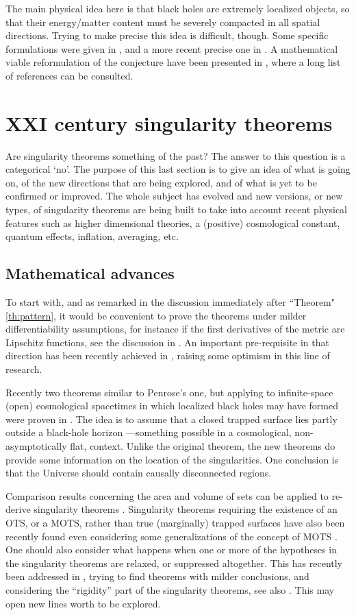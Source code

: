 \documentclass[12pt]{iopart}
\begin{document}
The main physical idea here is that black holes are extremely localized objects, so that their energy/matter content must be severely compacted in all spatial directions. Trying to make precise this idea is difficult, though. Some specific formulations were given in \cite{Fla}, and a more recent precise one in \cite{GiHoop,CGP}. A mathematical viable reformulation of the conjecture have been presented in \cite{S4}, where a long list of references can be consulted. 

 
\section{XXI century singularity theorems}\label{sec:XXI}
Are singularity theorems something of the past? The answer to this question is a categorical `no'. The purpose of this last section is to give an idea of what is going on, of the new directions that are being explored, and of what is yet to be confirmed or improved. The whole subject has evolved and new versions, or new types, of singularity theorems are being built to take into account recent physical features such as higher dimensional theories, a (positive) cosmological constant, quantum effects, inflation, averaging, etc. 

\subsection{Mathematical advances}
To start with, and as remarked in the discussion immediately after ``Theorem" \ref{th:pattern}, it would be convenient to prove the theorems under milder differentiability assumptions, for instance if the first derivatives of the metric are Lipschitz functions, see the discussion in \cite{S1}. An important pre-requisite in that direction has been recently achieved in \cite{Ming,KSSV}, raising some optimism in this line of research. 

Recently two theorems similar to Penrose's one, but applying to infinite-space (open) cosmological spacetimes in which localized black holes may have formed were proven in \cite{VW}. The idea is to assume that a closed trapped surface lies partly outside a black-hole horizon ---something possible in a cosmological, non-asymptotically flat, context. Unlike the original theorem, the new theorems do provide some information on the location of the singularities. One conclusion is that the Universe should contain causally disconnected regions.

Comparison results concerning the area and volume of sets can be applied to re-derive singularity theorems \cite{TG}. Singularity theorems requiring the existence of an OTS, or a MOTS, rather than true (marginally) trapped surfaces have also been recently found \cite{AMMS} even considering some generalizations of the concept of MOTS \cite{EGP,CeS1}. One should also consider what happens when one or more of the hypotheses in the singularity theorems are relaxed, or suppressed altogether. This has recently been addressed in \cite{CF}, trying to find theorems with milder conclusions, and considering the ``rigidity'' part of the singularity theorems, see also \cite{GaVe}. This may open new lines worth to be explored. 
\end{document}
